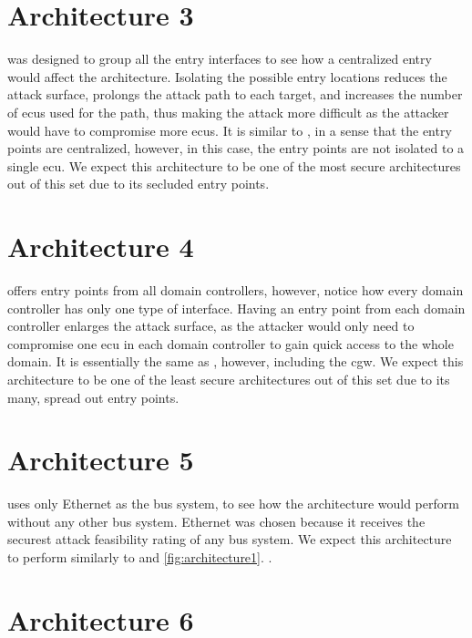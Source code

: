 \section{Architecture 3}
\label{subsec:arch3}

 was designed to group all the entry interfaces to see how a centralized entry would affect the architecture. 
Isolating the possible entry locations reduces the attack surface, prolongs the attack path to each target, 
and increases the number of \gls{ecu}s used for the path, thus making the attack more difficult as the attacker would have to compromise more \gls{ecu}s. 
It is similar to , in a sense that the entry points are centralized, however, in this case, the entry points are not isolated to a single \gls{ecu}.
We expect this architecture to be one of the most secure architectures out of this set due to its secluded entry points.

\section{Architecture 4}
\label{subsec:arch4}

 offers entry points from all domain controllers, 
however, notice how every domain controller has only one type of interface. 
Having an entry point from each domain controller enlarges the attack surface, 
as the attacker would only need to compromise one \gls{ecu} in each domain controller to gain quick access to the whole domain. 
It is essentially the same as , however, including the \gls{cgw}.
We expect this architecture to be one of the least secure architectures out of this set due to its many, spread out entry points.

\section{Architecture 5}
\label{subsec:arch5}

 uses only Ethernet as the bus system, 
to see how the architecture would perform without any other bus system. 
Ethernet was chosen because it receives the securest attack feasibility rating of any bus system.
We expect this architecture to perform similarly to  and \ref{fig:architecture1}. .

\section{Architecture 6}
\label{subsec:arch6}

